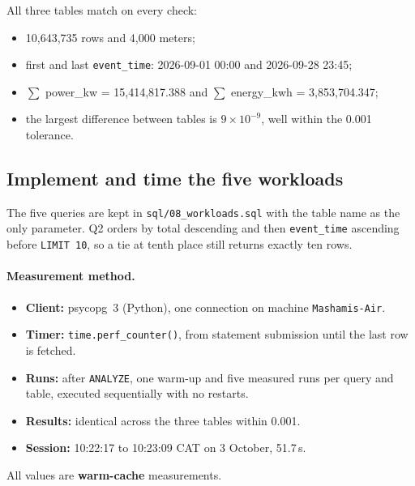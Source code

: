 \documentclass[11pt,a4paper]{article}
\begin{document}
All three tables match on every check:
\begin{itemize}
\item 10,643,735 rows and 4,000 meters;
\item first and last \texttt{event\_time}: 2026-09-01 00:00 and 2026-09-28 23:45;
\item $\sum$ power\_kw = 15,414,817.388 and $\sum$ energy\_kwh = 3,853,704.347;
\item the largest difference between tables is $9\times10^{-9}$, well within the
0.001 tolerance.
\end{itemize}



\subsection{Implement and time the five workloads}
The five queries are kept in \texttt{sql/08\_workloads.sql} with the table name as
the only parameter. Q2 orders by total descending and then \texttt{event\_time}
ascending before \texttt{LIMIT 10}, so a tie at tenth place still returns exactly ten
rows.

\paragraph{Measurement method.}
\begin{itemize}
\item \textbf{Client:} psycopg~3 (Python), one connection on machine
\texttt{Mashamis-Air}.
\item \textbf{Timer:} \texttt{time.perf\_counter()}, from statement submission until
the last row is fetched.
\item \textbf{Runs:} after \texttt{ANALYZE}, one warm-up and five measured runs per
query and table, executed sequentially with no restarts.
\item \textbf{Results:} identical across the three tables within 0.001.
\item \textbf{Session:} 10:22:17 to 10:23:09 CAT on 3 October, 51.7\,s.
\end{itemize}
All values are \textbf{warm-cache} measurements.
\end{document}
